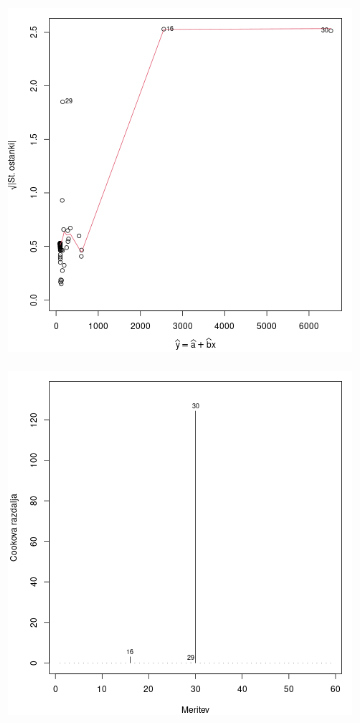 \begin{figure}[h]
    \begin{subfigure}[ht]{0.49\textwidth}
        \includegraphics[width=1\textwidth]{res/netrans-homogenost-variance.png}
        \label{img:netrans-linearnost-modela}
    \end{subfigure}
    \hfill
    \begin{subfigure}[ht]{0.49\textwidth}
        \includegraphics[width=1\textwidth]{res/netrans-vpliv-tock-na-model.png}

\end{subfigure}
\end{figure}
